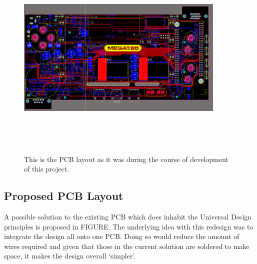 \begin{figure} [h]
\begin{centering}
\includegraphics[width=10cm,height=10cm,keepaspectratio]{Figures/pcb_original.png}
\caption{This is the PCB layout as it was during the course of development of this project.}
\label{fig:ThisFig}
\end{centering}
\end{figure}

\subsection{Proposed PCB Layout}

A possible solution to the existing PCB which does inhabit the Universal Design principles is proposed in FIGURE. 
The underlying idea with this redesign was to integrate the design all onto one PCB. 
Doing so would reduce the amount of wires required and given that those in the current solution are soldered to make space, it makes the design overall ‘simpler’.

